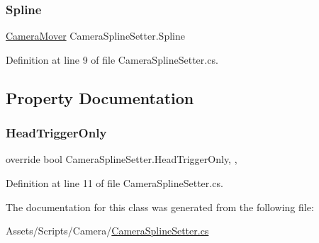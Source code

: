 \subsubsection{\texorpdfstring{Spline}{Spline}}
{\footnotesize\ttfamily \mbox{\hyperlink{class_camera_mover}{Camera\+Mover}} Camera\+Spline\+Setter.\+Spline}



Definition at line 9 of file Camera\+Spline\+Setter.\+cs.



\subsection{Property Documentation}
\mbox{\label{class_camera_spline_setter_af040b0c7da8b78dac794a5c6e04ce405}} 
\subsubsection{\texorpdfstring{Head\+Trigger\+Only}{HeadTriggerOnly}}
{\footnotesize\ttfamily override bool Camera\+Spline\+Setter.\+Head\+Trigger\+Only\hspace{0.3cm}{\ttfamily [get]}, {\ttfamily [set]}, {\ttfamily [protected]}}



Definition at line 11 of file Camera\+Spline\+Setter.\+cs.



The documentation for this class was generated from the following file\+:\begin{DoxyCompactItemize}
\item 
Assets/\+Scripts/\+Camera/\mbox{\hyperlink{_camera_spline_setter_8cs}{Camera\+Spline\+Setter.\+cs}}\end{DoxyCompactItemize}
